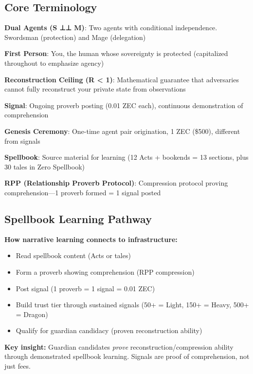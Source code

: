 \documentclass[
]{article}
\begin{document}
\subsection{Core Terminology}\label{core-terminology}

\textbf{Dual Agents (S ⊥⊥ M)}: Two agents with conditional independence.
Swordsman (protection) and Mage (delegation)

\textbf{First Person}: You, the human whose sovereignty is protected
(capitalized throughout to emphasize agency)

\textbf{Reconstruction Ceiling (R \textless{} 1)}: Mathematical
guarantee that adversaries cannot fully reconstruct your private state
from observations

\textbf{Signal}: Ongoing proverb posting (0.01 ZEC each), continuous
demonstration of comprehension

\textbf{Genesis Ceremony}: One-time agent pair origination, 1 ZEC
(\$500), different from signals

\textbf{Spellbook}: Source material for learning (12 Acts + bookends =
13 sections, plus 30 tales in Zero Spellbook)

\textbf{RPP (Relationship Proverb Protocol)}: Compression protocol
proving comprehension---1 proverb formed = 1 signal posted

\subsection{Spellbook Learning
Pathway}\label{spellbook-learning-pathway}

\textbf{How narrative learning connects to infrastructure:}

\begin{itemize}
\item
  Read spellbook content (Acts or tales)
\item
  Form a proverb showing comprehension (RPP compression)
\item
  Post signal (1 proverb = 1 signal = 0.01 ZEC)
\item
  Build trust tier through sustained signals (50+ = Light, 150+ = Heavy,
  500+ = Dragon)
\item
  Qualify for guardian candidacy (proven reconstruction ability)
\end{itemize}

\textbf{Key insight:} Guardian candidates \emph{prove}
reconstruction/compression ability through demonstrated spellbook
learning. Signals are proof of comprehension, not just fees.
\end{document}
